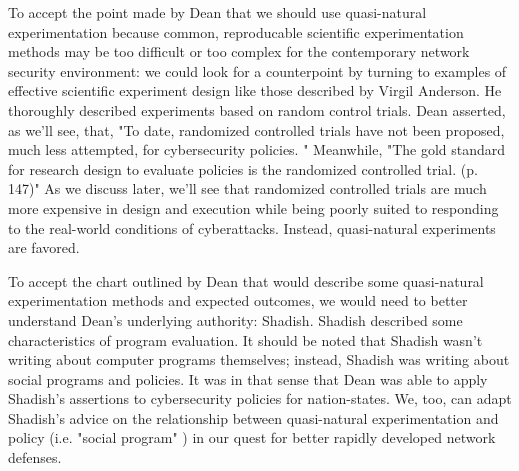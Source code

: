 To accept the point made by Dean  that we should use quasi-natural experimentation because common, reproducable scientific experimentation methods may be too difficult or too complex for the contemporary network security environment: we could look for a counterpoint by turning to examples of effective scientific experiment design like those described by Virgil Anderson.  He thoroughly described experiments based on random control trials. Dean asserted, as we'll see, that, "To date, randomized controlled trials have not been proposed, much less attempted, for cybersecurity policies. " Meanwhile, "The gold standard for research design to evaluate policies is the randomized controlled trial. (p. 147)" As we discuss later, we'll see that randomized controlled trials are much more expensive in design and execution while being poorly suited to responding to the real-world conditions of cyberattacks. Instead, quasi-natural experiments are favored.

To accept the chart outlined by Dean  that would describe some quasi-natural experimentation methods and expected outcomes, we would need to better understand Dean's underlying authority: Shadish. Shadish described some characteristics of program evaluation. It should be noted that Shadish wasn't writing about computer programs themselves; instead, Shadish was writing about social programs and policies. It was in that sense that Dean was able to apply Shadish's assertions to cybersecurity policies for nation-states. We, too, can adapt Shadish's advice on the relationship between quasi-natural experimentation and policy (i.e. "social program" ) in our quest for better rapidly developed network defenses.

